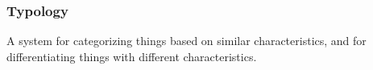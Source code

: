 \documentclass[aspectratio=169]{beamer}
\theoremstyle{principle}
\begin{document}
\begin{frame}
\frametitle{Typology}
\begin{center}
\Large A system for categorizing things based on similar characteristics, and for differentiating things with different characteristics.
\end{center}
\end{frame}

%
\end{document}

